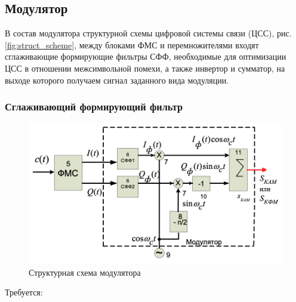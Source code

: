 \documentclass[a4paper, 12pt]{article}
\begin{document}
\subsection{Модулятор}
В состав модулятора структурной схемы цифровой системы связи (ЦСС), 
рис. \ref{fig:struct_scheme}, между блоками ФМС и перемножителями 
входят сглаживающие формирующие фильтры СФФ, необходимые для 
оптимизации ЦСС в отношении межсимвольной помехи, а также инвертор и 
сумматор, на выходе которого получаем сигнал заданного вида модуляции.

\subsubsection{Сглаживающий формирующий фильтр}
\begin{figure}
  \centering
  \includegraphics[scale=0.6]{modulator}
  \caption{Структурная схема модулятора}
  \label{fig:modulator}
\end{figure}
Требуется:
\end{document}
